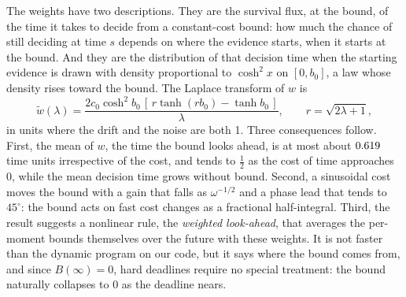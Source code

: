 \documentclass[11pt]{article}
\theoremstyle{definition}
\theoremstyle{remark}
\begin{document}
The weights have two descriptions. They are the survival flux, at the bound, of the time it takes
to decide from a constant-cost bound: how much the chance of still deciding at time $s$ depends on
where the evidence starts, when it starts at the bound. And they are the distribution of that
decision time when the starting evidence is drawn with density proportional to $\cosh^2 x$ on
$[0, b_0]$, a law whose density rises toward the bound. The Laplace transform of $w$ is
\begin{equation}
  \tilde w(\lambda) = \frac{2c_0\cosh^2 b_0\,[\,r\tanh(rb_0) - \tanh b_0\,]}{\lambda},
  \qquad r = \sqrt{2\lambda + 1},
  \label{eq:transfer-intro}
\end{equation}
in units where the drift and the noise are both 1. Three consequences follow. First, the mean of
$w$, the time the bound looks ahead, is at most about $0.619$ time units irrespective of
the cost, and tends to $\tfrac12$ as the cost of time approaches 0, while the mean decision time
grows without bound. Second, a sinusoidal cost moves the bound with a gain that falls as
$\omega^{-1/2}$ and a phase lead that tends to $45^\circ$: the bound acts on fast cost changes as a
fractional half-integral. Third, the result suggests a nonlinear rule, the \emph{weighted
look-ahead}, that averages the per-moment bounds themselves over the future with these weights. It
is not faster than the dynamic program on our code, but it says where the bound comes from, and
since $B(\infty) = 0$, hard deadlines require no special treatment: the bound naturally collapses
to 0 as the deadline nears.
\end{document}
